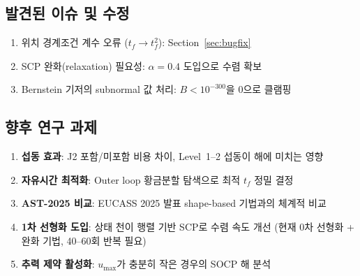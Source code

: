 \documentclass[11pt]{article}
\begin{document}
\subsection{발견된 이슈 및 수정}

\begin{enumerate}
  \item 위치 경계조건 계수 오류 ($t_f \to t_f^2$): Section~\ref{sec:bugfix}
  \item SCP 완화(relaxation) 필요성: $\alpha=0.4$ 도입으로 수렴 확보
  \item Bernstein 기저의 subnormal 값 처리: $B < 10^{-300}$을 0으로 클램핑
\end{enumerate}

\subsection{향후 연구 과제}

\begin{enumerate}
  \item \textbf{섭동 효과}: J2 포함/미포함 비용 차이, Level~1--2 섭동이 해에 미치는 영향
  \item \textbf{자유시간 최적화}: Outer loop 황금분할 탐색으로 최적 $t_f$ 정밀 결정
  \item \textbf{AST-2025 비교}: EUCASS 2025 발표 shape-based 기법과의 체계적 비교
  \item \textbf{1차 선형화 도입}: 상태 천이 행렬 기반 SCP로 수렴 속도 개선
        (현재 0차 선형화 + 완화 기법, 40--60회 반복 필요)
  \item \textbf{추력 제약 활성화}: $u_{\max}$가 충분히 작은 경우의 SOCP 해 분석
\end{enumerate}



\end{document}
